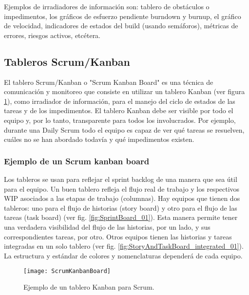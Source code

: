 Ejemplos de irradiadores de información son: tablero de obstáculos o impedimentos, los gráficos de esfuerzo pendiente burndown y burnup, el gráfico de velocidad, indicadores de estados del build (usando semáforos), métricas de errores, riesgos activos, etcétera.

\subsection{Tableros Scrum/Kanban}

El tablero Scrum/Kanban o "Scrum Kanban Board" es una técnica de comunicación y monitoreo que consiste en utilizar un tablero Kanban (ver figura \ref{fig:ScrumKanbanBoard}), como irradiador de información, para el manejo del ciclo de estados de las tareas y de los impedimentos. El tablero Kanban debe ser visible por todo el equipo y, por lo tanto, transparente para todos los involucrados. Por ejemplo, durante una Daily Scrum todo el equipo es capaz de ver qué tareas se resuelven, cuáles no se han abordado todavía y qué impedimentos existen.

\subsubsection{Ejemplo de un Scrum kanban board}

Los tableros se usan para reflejar el sprint backlog de una manera que sea útil para el equipo. Un buen tablero refleja el flujo real de trabajo y los respectivos WIP asociados a las etapas de trabajo (columnas). Hay equipos que tienen dos tableros: uno para el flujo de historias (story board) y otro para el flujo de las tareas (task board) (ver fig. \ref{fig:SprintBoard_01}). Esta manera permite tener una verdadera visibilidad del flujo de las historias, por un lado, y sus correspondientes tareas, por otro. Otros equipos tienen las historias y tareas integradas en un solo tablero (ver fig. \ref{fig:StoryAndTaskBoard_integrated_01}). La estructura y estándar de colores y nomenclaturas dependerá de cada equipo.

\begin{figure}[h]
  \centering
  \texttt{[image: ScrumKanbanBoard]}
  \caption{Ejemplo de un tablero Kanban para Scrum.}
  \centering
  \label{fig:ScrumKanbanBoard} %
\end{figure}
\FloatBarrier %

